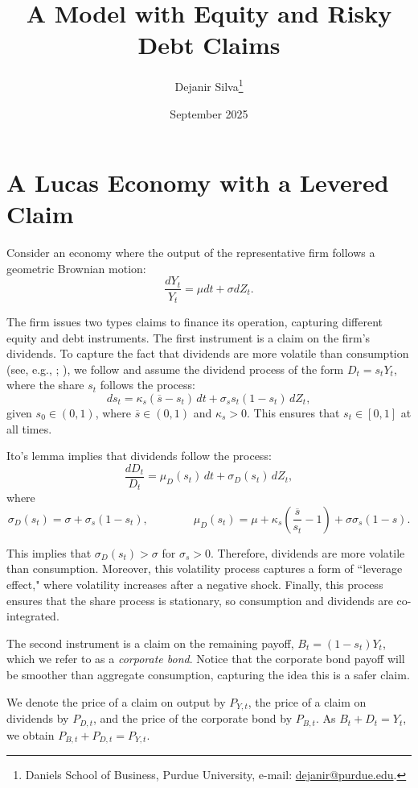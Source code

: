 \documentclass[11pt,english]{article}
\title{\textbf{A Model with Equity and Risky Debt Claims }}
\author{ Dejanir Silva\thanks{Daniels School of Business, Purdue University, e-mail: \href{dejanir@purdue.edu}{dejanir@purdue.edu}.}}
\date{September 2025}
\begin{document}
	\maketitle
	
\section{A Lucas Economy with a Levered Claim}

Consider an economy where the output of the representative firm follows a geometric Brownian motion:
\begin{equation*}
    \frac{d Y_t}{Y_t} = \mu dt + \sigma d Z_t.
\end{equation*}

The firm issues two types claims to finance its operation, capturing different equity and debt instruments. 
The first instrument is a claim on the firm's dividends. 
To capture the fact that dividends are more volatile than consumption (see, e.g., \citealt{Abel1999LeverageDividends}; \citealt{Campbell1999AssetPrices}), we follow \citet{MenzlySantosVeronesi2004} and assume the dividend process of the form $D_t = s_t Y_t$, where the share $s_t$ follows the process:
\begin{equation}
    d s_t = \kappa_s (\overline{s} - s_t)\, dt + \sigma_s s_t (1-s_t)\, dZ_t,
\end{equation}
given $s_0 \in (0,1)$, where $\overline{s} \in (0,1)$ and $\kappa_s > 0$. This ensures that $s_t \in [0,1]$ at all times. 

Ito's lemma implies that dividends follow the process:
\begin{equation}
    \frac{d D_t}{D_t} = \mu_D(s_t)\, dt + \sigma_D(s_t)\, dZ_t,
\end{equation}
where
\begin{equation}
    \sigma_{D}(s_t) = \sigma + \sigma_s (1-s_t), \qquad \qquad 
    \mu_D(s_t) = \mu + \kappa_s \left( \frac{\overline{s}}{s_t}-1\right) + \sigma \sigma_s(1-s).
\end{equation}

This implies that $\sigma_{D}(s_t) > \sigma$ for $\sigma_s > 0$. 
Therefore, dividends are more volatile than consumption. 
Moreover, this volatility process captures a form of ``leverage effect," where volatility increases after a negative shock. 
Finally, this process ensures that the share process is stationary, so consumption and dividends are co-integrated. 

The second instrument is a claim on the remaining payoff, $B_t = (1-s_t) Y_t$, which we refer to as a \textit{corporate bond}. 
Notice that the corporate bond payoff will be smoother than aggregate consumption, capturing the idea this is a safer claim. 

We denote the price of a claim on output by $P_{Y,t}$, the price of a claim on dividends by $P_{D,t}$, and the price of the corporate bond by $P_{B,t}$. 
As $B_t+D_t = Y_t$, we obtain $P_{B,t} +P_{D,t}= P_{Y,t}$.




\newpage
\singlespacing
%
\clearpage

\end{document}
